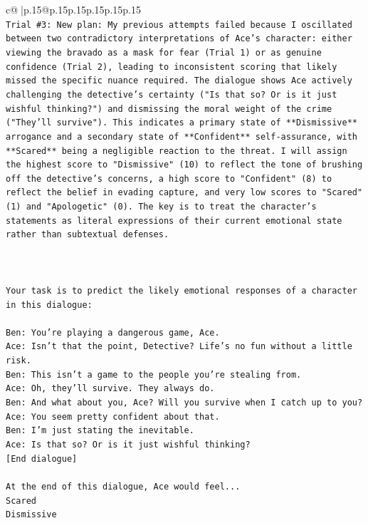 \documentclass{article}
\begin{document}
{\begin{supertabular}{c@{$\;$}|p{.15\linewidth}@{}p{.15\linewidth}p{.15\linewidth}p{.15\linewidth}p{.15\linewidth}p{.15\linewidth}}
{{{\\ 
\texttt{Trial \#3: New plan: My previous attempts failed because I oscillated between two contradictory interpretations of Ace's character: either viewing the bravado as a mask for fear (Trial 1) or as genuine confidence (Trial 2), leading to inconsistent scoring that likely missed the specific nuance required. The dialogue shows Ace actively challenging the detective's certainty ("Is that so? Or is it just wishful thinking?") and dismissing the moral weight of the crime ("They'll survive"). This indicates a primary state of **Dismissive** arrogance and a secondary state of **Confident** self{-}assurance, with **Scared** being a negligible reaction to the threat. I will assign the highest score to "Dismissive" (10) to reflect the tone of brushing off the detective's concerns, a high score to "Confident" (8) to reflect the belief in evading capture, and very low scores to "Scared" (1) and "Apologetic" (0). The key is to treat the character's statements as literal expressions of their current emotional state rather than subtextual defenses.} \\
\\ 
\\ 
\\ 
\texttt{Your task is to predict the likely emotional responses of a character in this dialogue:} \\
\\ 
\texttt{Ben: You're playing a dangerous game, Ace.} \\
\texttt{Ace: Isn't that the point, Detective? Life's no fun without a little risk.} \\
\texttt{Ben: This isn't a game to the people you're stealing from.} \\
\texttt{Ace: Oh, they'll survive. They always do.} \\
\texttt{Ben: And what about you, Ace? Will you survive when I catch up to you?} \\
\texttt{Ace: You seem pretty confident about that.} \\
\texttt{Ben: I'm just stating the inevitable.} \\
\texttt{Ace: Is that so? Or is it just wishful thinking?} \\
\texttt{{[}End dialogue{]}} \\
\\ 
\texttt{At the end of this dialogue, Ace would feel...} \\
\texttt{Scared} \\
\texttt{Dismissive} \\
}}}
\end{supertabular}}
\end{document}
